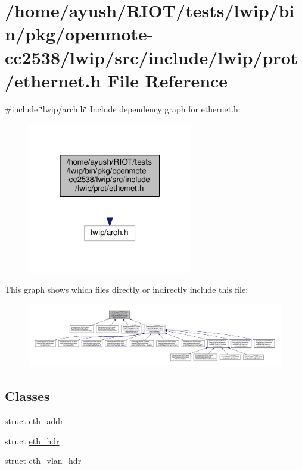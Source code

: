 \hypertarget{openmote-cc2538_2lwip_2src_2include_2lwip_2prot_2ethernet_8h}{}\section{/home/ayush/\+R\+I\+O\+T/tests/lwip/bin/pkg/openmote-\/cc2538/lwip/src/include/lwip/prot/ethernet.h File Reference}
\label{openmote-cc2538_2lwip_2src_2include_2lwip_2prot_2ethernet_8h}
{\ttfamily \#include \char`\"{}lwip/arch.\+h\char`\"{}}\newline
Include dependency graph for ethernet.\+h\+:
\nopagebreak
\begin{figure}[H]
\begin{center}
\leavevmode
\includegraphics[width=205pt]{openmote-cc2538_2lwip_2src_2include_2lwip_2prot_2ethernet_8h__incl}
\end{center}
\end{figure}
This graph shows which files directly or indirectly include this file\+:
\nopagebreak
\begin{figure}[H]
\begin{center}
\leavevmode
\includegraphics[width=350pt]{openmote-cc2538_2lwip_2src_2include_2lwip_2prot_2ethernet_8h__dep__incl}
\end{center}
\end{figure}
\subsection*{Classes}
\begin{DoxyCompactItemize}
\item 
struct \hyperlink{structeth__addr}{eth\+\_\+addr}
\item 
struct \hyperlink{structeth__hdr}{eth\+\_\+hdr}
\item 
struct \hyperlink{structeth__vlan__hdr}{eth\+\_\+vlan\+\_\+hdr}
\end{DoxyCompactItemize}
